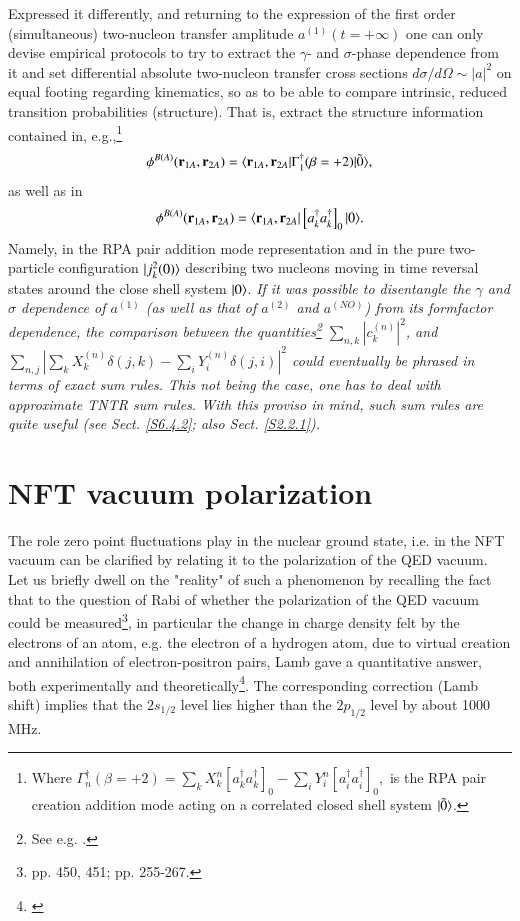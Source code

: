 \begin{subappendices}
 
 Expressed it differently, and returning to the expression of the first order (simultaneous) two-nucleon transfer amplitude $a^{(1)}(t=+\infty)$ one can only devise empirical protocols to try to extract the $\gamma$- and $\sigma$-phase dependence  from it and set differential absolute two-nucleon transfer cross sections $d\sigma/d\Omega\sim |a|^2$ on equal footing regarding kinematics, so as to be able to compare  intrinsic, reduced transition probabilities (structure). That is, extract the structure information contained in, e.g.,\footnote{Where
 	$\Gamma_n^\dagger(\beta=+2)=\sum_k X_k^n\left[a^\dagger_ka^\dagger_k\right]_0-\sum_i Y^n_i \left[a^\dagger_i a^\dagger_i\right]_0,$
 	is the RPA pair creation addition mode acting on  a correlated closed shell system $|{\tilde 0} \rangle$. }
 \begin{align}
 \phi^{B(A)}(\mathbf r_{1A},\mathbf r_{2A})=\langle {\mathbf r_{1A},\mathbf r_{2A}|\Gamma^\dagger_1(\beta=+2)|\tilde 0} \rangle,
 \end{align}
 as well as in
 \begin{align}\label{eq2.D.48}
 \phi^{B(A)}(\mathbf r_{1A},\mathbf r_{2A})=\langle {\mathbf r_{1A},\mathbf r_{2A}}|\left[a^\dagger_ka^\dagger_k\right]_0|{0} \rangle.
 \end{align}
 Namely, in the RPA pair addition mode representation and in the pure two-particle configuration $|{j^2_k(0)} \rangle$ describing two nucleons moving in time reversal states around the close shell system $|{0} \rangle$. \textit{If it was possible to disentangle the $\gamma$ and $\sigma$ dependence of $a^{(1)}$ (as well as that of $a^{(2)}$ and $a^{(NO)}$) from its formfactor dependence, the comparison between the quantities\footnote{See e.g. \cite{Broglia:67}.} $\sum_{n,k}|c^{(n)}_k|^2$, and\\ $\sum_{n,j}\left|\sum_kX^{(n)}_k\delta(j,k)-\sum_iY^{(n)}_i\delta(j,i)\right|^2$ could  eventually be phrased in terms of exact sum rules. This not being  the case, one has to  deal with approximate TNTR sum rules. With this proviso in mind, such sum rules are quite useful (see Sect. \ref{S6.4.2}; also  Sect. \ref{S2.2.1}).} 
 
 
 \section{NFT vacuum polarization}\label{App1.E}
 The role zero point fluctuations play in the nuclear ground state, i.e. in the NFT vacuum  can
 be  clarified by relating it to the polarization of the QED vacuum.
 Let us briefly dwell on the "reality" of such a phenomenon by recalling the fact that
 to the question of Rabi of whether the polarization of the QED vacuum could be measured\footnote{\cite{Pais:86} pp. 450, 451; \cite{Pais:00} pp. 255-267.}, in particular
 the change in charge  density felt by the electrons of an atom,  e.g. the electron of a hydrogen atom, due to
 virtual creation and annihilation of electron-positron pairs,  Lamb gave a quantitative answer, both experimentally
 and theoretically\footnote{\cite{Lamb:47,Kroll:49}}. The corresponding correction  (Lamb shift) implies that the $2s_{1/2}$ level lies 
 higher than the $2p_{1/2}$ level by about 1000 MHz.  
 

\end{subappendices}
